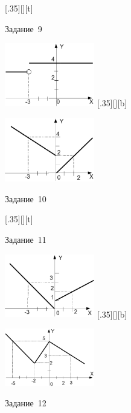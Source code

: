 \begin{figure}[H]
\begin{floatrow}
[.35\textwidth][\FBheight][t]
{\caption{Задание~9}
\label{ch03:refDrawing46}}
{\includegraphics[width=0.35\textwidth,keepaspectratio]{img/ris_3_47}}%
%
[.35\textwidth][\FBheight][b]
{\caption{Задание~10}
\label{ch03:refDrawing47}}
{\includegraphics[width=0.35\textwidth]{img/ris_3_48}}
\end{floatrow}
\end{figure}

\begin{figure}[H]
\begin{floatrow}
[.35\textwidth][\FBheight][t]
{\caption{Задание~11}
\label{ch03:refDrawing48}}
{\includegraphics[width=0.35\textwidth,keepaspectratio]{img/ris_3_49}}%
%
[.35\textwidth][\FBheight][b]
{\caption{Задание~12}
\label{ch03:refDrawing49}}
{\includegraphics[width=0.35\textwidth]{img/ris_3_50}}
\end{floatrow}
\end{figure}

